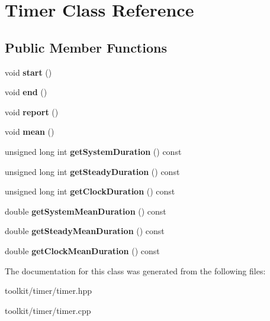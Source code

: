 \hypertarget{classTimer}{
\section{Timer Class Reference}
\label{classTimer}
}
\subsection*{Public Member Functions}
\begin{DoxyCompactItemize}
\item 
\hypertarget{classTimer_a3a8b5272198d029779dc9302a54305a8}{
void {\bfseries start} ()}
\label{classTimer_a3a8b5272198d029779dc9302a54305a8}

\item 
\hypertarget{classTimer_accef2f2b25869fbca2947a56b494d2a0}{
void {\bfseries end} ()}
\label{classTimer_accef2f2b25869fbca2947a56b494d2a0}

\item 
\hypertarget{classTimer_ab639c59072f1af668e8f0b01899fbed5}{
void {\bfseries report} ()}
\label{classTimer_ab639c59072f1af668e8f0b01899fbed5}

\item 
\hypertarget{classTimer_af28858556e8ac4c505468d1210a49d15}{
void {\bfseries mean} ()}
\label{classTimer_af28858556e8ac4c505468d1210a49d15}

\item 
\hypertarget{classTimer_aae9d7e44b7654b79a71a28610f472dc2}{
unsigned long int {\bfseries getSystemDuration} () const }
\label{classTimer_aae9d7e44b7654b79a71a28610f472dc2}

\item 
\hypertarget{classTimer_aef017bfde0fe245144cf8fae12d97f1b}{
unsigned long int {\bfseries getSteadyDuration} () const }
\label{classTimer_aef017bfde0fe245144cf8fae12d97f1b}

\item 
\hypertarget{classTimer_a020ef435f33626196167258c433d21fd}{
unsigned long int {\bfseries getClockDuration} () const }
\label{classTimer_a020ef435f33626196167258c433d21fd}

\item 
\hypertarget{classTimer_ae6c489547ff4e4cd5273e424cbff074c}{
double {\bfseries getSystemMeanDuration} () const }
\label{classTimer_ae6c489547ff4e4cd5273e424cbff074c}

\item 
\hypertarget{classTimer_ad4fe2d4c8b869d3253cbf5ac6d319753}{
double {\bfseries getSteadyMeanDuration} () const }
\label{classTimer_ad4fe2d4c8b869d3253cbf5ac6d319753}

\item 
\hypertarget{classTimer_a1f07136a98a856a18c6e0a1350f15ff5}{
double {\bfseries getClockMeanDuration} () const }
\label{classTimer_a1f07136a98a856a18c6e0a1350f15ff5}

\end{DoxyCompactItemize}


The documentation for this class was generated from the following files:\begin{DoxyCompactItemize}
\item 
toolkit/timer/timer.hpp\item 
toolkit/timer/timer.cpp\end{DoxyCompactItemize}
